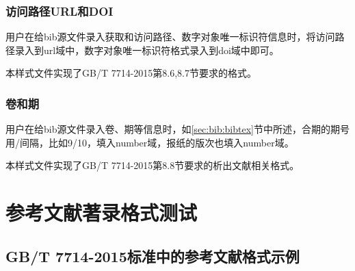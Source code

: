 \subsubsection{访问路径URL和DOI}
\begin{property}{}{}
用户在给bib源文件录入获取和访问路径、数字对象唯一标识符信息时，将访问路径录入到url域中，数字对象唯一标识符格式录入到doi域中即可。

本样式文件实现了GB/T 7714-2015第8.6,8.7节要求的格式。
\end{property}

\subsubsection{卷和期}
\begin{property}{}{}
用户在给bib源文件录入卷、期等信息时，如\ref{sec:bib:bibtex}节中所述，合期的期号用/间隔，比如9/10，填入number域，报纸的版次也填入number域。

本样式文件实现了GB/T 7714-2015第8.8节要求的析出文献相关格式。
\end{property}




\section{参考文献著录格式测试}

\subsection{GB/T 7714-2015标准中的参考文献格式示例}\label{sec:eg:gb77142015}

